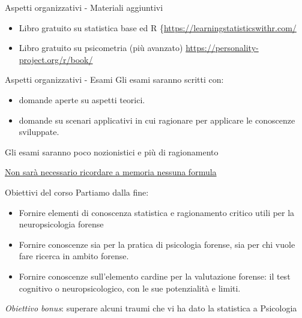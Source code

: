 \documentclass[
  ignorenonframetext,
]{beamer}
\providecommand{\tightlist}{%
  \setlength{\itemsep}{0pt}\setlength{\parskip}{0pt}}
\begin{document}
\begin{frame}{Aspetti organizzativi - Materiali aggiuntivi}
\label{aspetti-organizzativi---materiali-aggiuntivi}
\begin{itemize}[<+->]
\item
  Libro gratuito su statistica base ed R
  \{\underline{https://learningstatisticswithr.com/}
\item
  Libro gratuito su psicometria (più avanzato)
  \underline{https://personality-project.org/r/book/}
\end{itemize}
\end{frame}

\begin{frame}{Aspetti organizzativi - Esami}
\label{aspetti-organizzativi---esami}
Gli esami saranno scritti con:

\begin{itemize}[<+->]
\tightlist
\item
  domande aperte su aspetti teorici.
\item
  domande su scenari applicativi in cui ragionare per applicare le
  conoscenze sviluppate.
\end{itemize}

Gli esami saranno poco nozionistici e più di ragionamento

\underline{Non sarà necessario ricordare a memoria nessuna formula}
\end{frame}

\begin{frame}{Obiettivi del corso}
\label{obiettivi-del-corso}
Partiamo dalla fine:

\begin{itemize}[<+->]
\tightlist
\item
  Fornire elementi di conoscenza statistica e ragionamento critico utili
  per la neuropsicologia forense
\item
  Fornire conoscenze sia per la pratica di psicologia forense, sia per
  chi vuole fare ricerca in ambito forense.
\item
  Fornire conoscenze sull'elemento cardine per la valutazione forense:
  il test cognitivo o neuropsicologico, con le sue potenzialità e
  limiti.
\end{itemize}

\emph{Obiettivo bonus}: superare alcuni traumi che vi ha dato la
statistica a Psicologia
\end{frame}
\end{document}
